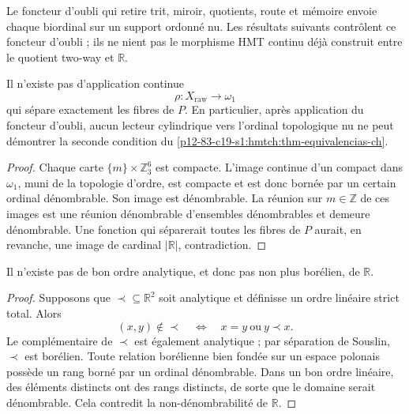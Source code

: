 Le foncteur d'oubli qui retire trit, miroir, quotients, route et mémoire envoie
chaque biordinal sur un support ordonné nu. Les résultats suivants
contrôlent ce foncteur d'oubli ; ils ne nient pas le morphisme HMT continu déjà
construit entre le quotient two-way et \(\mathbb R\).

\begin{theorem}
\label{p12-83-c19-s1:hmtch:thm-no-go-continuo}
Il n'existe pas d'application continue
\[
 \rho:X_{\mathrm{raw}}\longrightarrow\omega_1
\]
qui sépare exactement les fibres de \(P\). En particulier, après
application du foncteur d'oubli, aucun lecteur cylindrique vers l'ordinal
topologique nu ne peut démontrer la seconde condition du
\cref{p12-83-c19-s1:hmtch:thm-equivalencias-ch}.
\end{theorem}

\begin{proof}
Chaque carte \(\{m\}\times\mathbb Z_3^6\) est compacte. L'image continue d'un
compact dans \(\omega_1\), muni de la topologie d'ordre, est compacte et
est donc bornée par un certain ordinal dénombrable. Son image est dénombrable.
La réunion sur \(m\in\mathbb Z\) de ces images est une réunion dénombrable
d'ensembles dénombrables et demeure dénombrable. Une fonction qui séparerait toutes
les fibres de \(P\) aurait, en revanche, une image de cardinal
\(|\mathbb R|\), contradiction.
\end{proof}

\begin{theorem}
\label{p12-83-c19-s1:hmtch:thm-no-go-analitico}
Il n'existe pas de bon ordre analytique, et donc pas non plus borélien, de
\(\mathbb R\).
\end{theorem}

\begin{proof}
Supposons que \(\prec\subseteq\mathbb R^2\) soit analytique et définisse un ordre
linéaire strict total. Alors
\[
 (x,y)\notin\prec
 \quad\Longleftrightarrow\quad
 x=y\ \text{ou}\ y\prec x.
\]
Le complémentaire de \(\prec\) est également analytique ; par séparation de Souslin,
\(\prec\) est borélien. Toute relation borélienne bien fondée sur un espace
polonais possède un rang borné par un ordinal dénombrable. Dans un bon ordre linéaire,
des éléments distincts ont des rangs distincts, de sorte que le domaine serait
dénombrable. Cela contredit la non-dénombrabilité de \(\mathbb R\).
\end{proof}

